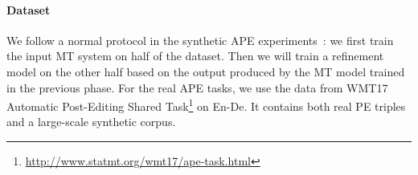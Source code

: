 \documentclass{article}
\begin{document}
\paragraph{Dataset}
We follow a normal protocol in the synthetic APE experiments~\citep{grangier2017quickedit}:
we first train the input MT system on half of the dataset. Then we will train a refinement model on the other half based on the output produced by the MT model trained in the previous phase.
For the real APE tasks, we use the data from WMT17 Automatic Post-Editing Shared Task\footnote{\url{http://www.statmt.org/wmt17/ape-task.html}} on En-De. It contains both real PE triples and a large-scale synthetic corpus.
\begin{table}[t]
    \centering
    \caption{\label{table.ape}Performance (BLEU  / case-sensitive TER ) comparison on APE. ``do nothing'' represents the results of the original MT system output; the autoregressive model uses beam-size . For the proposed LevT, we use ``scratch'' to denote training from scratch on the APE triple data, and use ``zero-shot'' to denote applying an MT pre-trained LevT model directly for post-editing tasks. The same model can be further fine-tuned. 
    All scores with \underline{underlines} are from the model trained with an autoregressive teacher model (distillation) as the expert policy.}

    
\end{table}
\end{document}

